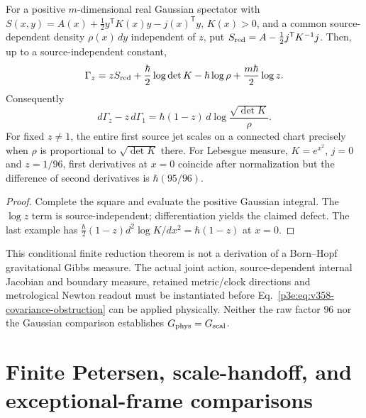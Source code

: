 \documentclass[12pt,a4paper]{article}
\begin{document}
\begin{corollary}
\label{p3e:cor:v358-gaussian-newton-measure}
For a positive $m$-dimensional real Gaussian spectator with
$S(x,y)=A(x)+\frac12y^\mathsf TK(x)y-j(x)^\mathsf Ty$,
$K(x)>0$, and a common source-dependent density $\rho(x)\,dy$
independent of $z$, put
$S_{\rm red}=A-\frac12j^\mathsf TK^{-1}j$.
Then, up to a source-independent constant,
\[
 \Gamma_z=zS_{\rm red}
  +\frac{\hbar}{2}\log\det K-\hbar\log\rho
  +\frac{m\hbar}{2}\log z.
\]
Consequently
\begin{equation}
\label{p3e:eq:v358-gaussian-jet-defect}
 d\Gamma_z-z\,d\Gamma_1
 =\hbar(1-z)\,d\log\frac{\sqrt{\det K}}{\rho}.
\end{equation}
For fixed $z\ne1$, the entire first source jet scales on a
connected chart precisely when $\rho$ is proportional to
$\sqrt{\det K}$ there.  For Lebesgue measure, $K=e^{x^2}$,
$j=0$ and $z=1/96$, first derivatives at $x=0$ coincide after
normalization but the difference of second derivatives is
$\hbar(95/96)$.
\end{corollary}
\begin{proof}
Complete the square and evaluate the positive Gaussian integral.
The $\log z$ term is source-independent; differentiation yields the
claimed defect.  The last example has
$\frac\hbar2(1-z)d^2\log K/dx^2=\hbar(1-z)$ at $x=0$.
\end{proof}

\begin{remark}
\label{p3e:rem:v358-newton-quantum-occurrence}
This conditional finite reduction theorem is not a derivation of a
Born--Hopf gravitational Gibbs measure.  The actual joint action,
source-dependent internal Jacobian and boundary measure, retained
metric/clock directions and metrological Newton readout must be
instantiated before Eq.~\eqref{p3e:eq:v358-covariance-obstruction}
can be applied physically.  Neither the raw factor $96$ nor the
Gaussian comparison establishes $G_{\rm phys}=G_{\rm scal}$.
\end{remark}


\section{Finite Petersen, scale-handoff, and exceptional-frame comparisons}
\label{paper3e:sec:v204-finite-comparisons}
\end{document}
